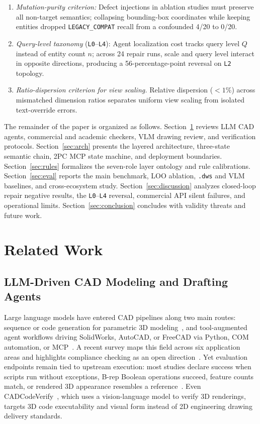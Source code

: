 \documentclass[nocopyright,nolists,upint,varvw,hyphenate]{asmejour}
\begin{document}
\begin{enumerate}
\item \emph{Mutation-purity criterion:} Defect injections in ablation studies must preserve all non-target semantics; collapsing bounding-box coordinates while keeping entities dropped \texttt{LEGACY\_COMPAT} recall from a confounded 4/20 to 0/20.
\item \emph{Query-level taxonomy} (\texttt{L0}--\texttt{L4}): Agent localization cost tracks query level $Q$ instead of entity count $n$; across 24 repair runs, scale and query level interact in opposite directions, producing a 56-percentage-point reversal on \texttt{L2} topology.
\item \emph{Ratio-dispersion criterion for view scaling.} Relative dispersion ($< 1\%$) across mismatched dimension ratios separates uniform view scaling from isolated text-override errors.
\end{enumerate}

The remainder of the paper is organized as follows. Section~\ref{sec:related} reviews LLM CAD agents, commercial and academic checkers, VLM drawing review, and verification protocols. Section~\ref{sec:arch} presents the layered architecture, three-state semantic chain, 2PC MCP state machine, and deployment boundaries. Section~\ref{sec:rules} formalizes the seven-role layer ontology and rule calibrations. Section~\ref{sec:eval} reports the main benchmark, LOO ablation, \texttt{.dws} and VLM baselines, and cross-ecosystem study. Section~\ref{sec:discussion} analyzes closed-loop repair negative results, the \texttt{L0}--\texttt{L4} reversal, commercial API silent failures, and operational limits. Section~\ref{sec:conclusion} concludes with validity threats and future work.

\section{Related Work}\label{sec:related}

\subsection{LLM-Driven CAD Modeling and Drafting Agents}

Large language models have entered CAD pipelines along two main routes: sequence or code generation for parametric 3D modeling~\cite{khan2024text2cad}, and tool-augmented agent workflows driving SolidWorks, AutoCAD, or FreeCAD via Python, COM automation, or MCP~\cite{mallis2024cadassistant}. A recent survey maps this field across six application areas and highlights compliance checking as an open direction~\cite{zhang2026llm}. Yet evaluation endpoints remain tied to upstream execution: most studies declare success when scripts run without exceptions, B-rep Boolean operations succeed, feature counts match, or rendered 3D appearance resembles a reference~\cite{khan2024text2cad,alrashedy2025cadcodeverify}. Even CADCodeVerify~\cite{alrashedy2025cadcodeverify}, which uses a vision-language model to verify 3D renderings, targets 3D code executability and visual form instead of 2D engineering drawing delivery standards.
\end{document}
